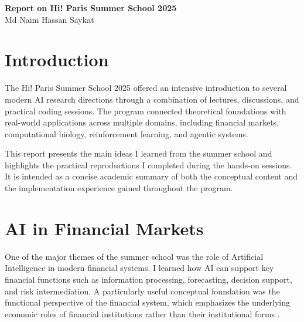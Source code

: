 \documentclass[11pt,a4paper]{article}
\begin{document}
\begin{center}
    {\LARGE \textbf{Report on Hi! Paris Summer School 2025}}\\[0.8em]
    
    {\large Md Naim Hassan Saykat}\\[0.25em]
\end{center}

\vspace{0.3em}

\begin{abstract}
This report summarizes the main concepts, methods, and practical insights gained during the Hi! Paris Summer School 2025, an interdisciplinary program covering advanced topics in Artificial Intelligence and Machine Learning across finance, biology, reinforcement learning, and intelligent agents. The combination of theoretical lectures and hands-on reproductions provided both research exposure and practical development experience, particularly in reinforcement learning, multi-armed bandits, and simulation-based experimentation.
\end{abstract}

\section{Introduction}
The Hi! Paris Summer School 2025 offered an intensive introduction to several modern AI research directions through a combination of lectures, discussions, and practical coding sessions. The program connected theoretical foundations with real-world applications across multiple domains, including financial markets, computational biology, reinforcement learning, and agentic systems.

This report presents the main ideas I learned from the summer school and highlights the practical reproductions I completed during the hands-on sessions. It is intended as a concise academic summary of both the conceptual content and the implementation experience gained throughout the program.

\section{AI in Financial Markets}
One of the major themes of the summer school was the role of Artificial Intelligence in modern financial systems. I learned how AI can support key financial functions such as information processing, forecasting, decision support, and risk intermediation. A particularly useful conceptual foundation was the functional perspective of the financial system, which emphasizes the underlying economic roles of financial institutions rather than their institutional forms \cite{merton1995}.
\end{document}
